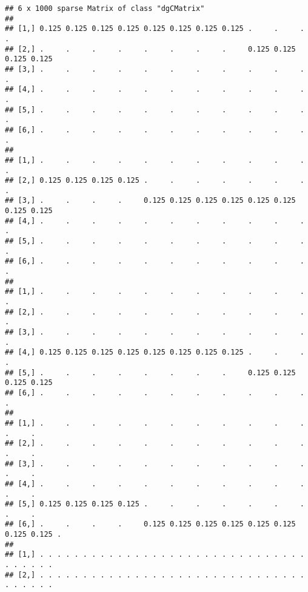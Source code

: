 \documentclass[
]{book}
\begin{document}
\begin{verbatim}
## 6 x 1000 sparse Matrix of class "dgCMatrix"
##                                                                             
## [1,] 0.125 0.125 0.125 0.125 0.125 0.125 0.125 0.125 .     .     .     .    
## [2,] .     .     .     .     .     .     .     .     0.125 0.125 0.125 0.125
## [3,] .     .     .     .     .     .     .     .     .     .     .     .    
## [4,] .     .     .     .     .     .     .     .     .     .     .     .    
## [5,] .     .     .     .     .     .     .     .     .     .     .     .    
## [6,] .     .     .     .     .     .     .     .     .     .     .     .    
##                                                                             
## [1,] .     .     .     .     .     .     .     .     .     .     .     .    
## [2,] 0.125 0.125 0.125 0.125 .     .     .     .     .     .     .     .    
## [3,] .     .     .     .     0.125 0.125 0.125 0.125 0.125 0.125 0.125 0.125
## [4,] .     .     .     .     .     .     .     .     .     .     .     .    
## [5,] .     .     .     .     .     .     .     .     .     .     .     .    
## [6,] .     .     .     .     .     .     .     .     .     .     .     .    
##                                                                             
## [1,] .     .     .     .     .     .     .     .     .     .     .     .    
## [2,] .     .     .     .     .     .     .     .     .     .     .     .    
## [3,] .     .     .     .     .     .     .     .     .     .     .     .    
## [4,] 0.125 0.125 0.125 0.125 0.125 0.125 0.125 0.125 .     .     .     .    
## [5,] .     .     .     .     .     .     .     .     0.125 0.125 0.125 0.125
## [6,] .     .     .     .     .     .     .     .     .     .     .     .    
##                                                                               
## [1,] .     .     .     .     .     .     .     .     .     .     .     .     .
## [2,] .     .     .     .     .     .     .     .     .     .     .     .     .
## [3,] .     .     .     .     .     .     .     .     .     .     .     .     .
## [4,] .     .     .     .     .     .     .     .     .     .     .     .     .
## [5,] 0.125 0.125 0.125 0.125 .     .     .     .     .     .     .     .     .
## [6,] .     .     .     .     0.125 0.125 0.125 0.125 0.125 0.125 0.125 0.125 .
##                                                                               
## [1,] . . . . . . . . . . . . . . . . . . . . . . . . . . . . . . . . . . . . .
## [2,] . . . . . . . . . . . . . . . . . . . . . . . . . . . . . . . . . . . . .

\end{verbatim}
\end{document}
